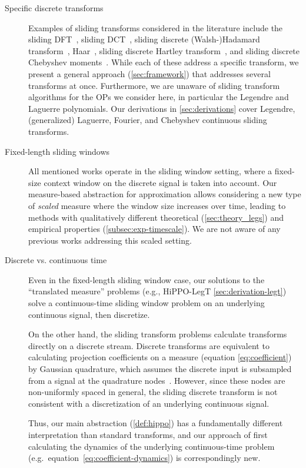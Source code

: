 \documentclass[../hippo.tex]{subfiles}
\begin{document}
\begin{description}%
  \item[Specific discrete transforms]
    Examples of sliding transforms considered in the literature include the sliding DFT~\cite{farhang1994generalized,jacobsen2003sliding,jacobsen2004update,duda2010accurate}, sliding DCT~\cite{kober2004fast}, sliding discrete (Walsh-)Hadamard transform~\cite{mozafari2007efficient,ouyang2009fast,wu2012sliding}, Haar~\cite{macias2005efficient}, sliding discrete Hartley transform~\cite{kober2007fast}, and sliding discrete Chebyshev moments~\cite{chen2015fast}.
    While each of these address a specific transform, we present a general approach (\cref{sec:framework}) that addresses several transforms at once.
    Furthermore, we are unaware of sliding transform algorithms for the OPs we consider here, in particular the Legendre and Laguerre polynomials.
    Our derivations in \cref{sec:derivations} cover Legendre, (generalized) Laguerre, Fourier, and Chebyshev continuous sliding transforms.
  \item[Fixed-length sliding windows]
    All mentioned works operate in the sliding window setting, where a fixed-size context window on the discrete signal is taken into account.
    Our measure-based abstraction for approximation 
    allows considering a new type of \emph{scaled} measure where the window size increases over time, leading to methods with qualitatively different theoretical (\cref{sec:theory_legs}) and empirical properties (\cref{subsec:exp-timescale}).
    We are not aware of any previous works addressing this scaled setting.
  \item[Discrete vs. continuous time]
    Even in the fixed-length sliding window case,
    our solutions to the ``translated measure'' problems (e.g., HiPPO-LegT \cref{sec:derivation-legt})
    solve a continuous-time sliding window problem on an underlying continuous signal, then discretize.

    On the other hand, the sliding transform problems calculate transforms directly on a discrete stream.
    Discrete transforms are equivalent to calculating projection coefficients on a measure (equation \eqref{eq:coefficient}) by Gaussian quadrature,
    which assumes the discrete input is subsampled from a signal at the quadrature nodes~\citep{chihara}.
    However, since these nodes are non-uniformly spaced in general, the sliding discrete transform is not consistent with a discretization of an underlying continuous signal.

    Thus, our main abstraction (\cref{def:hippo}) has a fundamentally different interpretation than standard transforms,
    and our approach of first calculating the dynamics of the underlying continuous-time problem (e.g.\ equation~\eqref{eq:coefficient-dynamics}) is correspondingly new.


\end{description}
\end{document}
